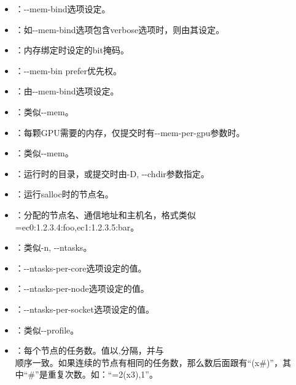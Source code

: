 \begin{itemize}
    \item {}：-{}-mem-bind选项设定。
    \item {}：如-{}-mem-bind选项包含verbose选项时，则由其设定。
    \item {}：内存绑定时设定的bit掩码。
	\item {}：-{}-mem-bin prefer优先权。
    \item {}：由-{}-mem-bind选项设定。
	\item {}：类似-{}-mem。
	\item {}：每颗GPU需要的内存，仅提交时有-{}-mem-per-gpu参数时。
	\item {}：类似-{}-mem。
	\item {}：运行时的目录，或提交时由-D, -{}-chdir参数指定。
	\item {}：运行salloc时的节点名。
	\item {}：分配的节点名、通信地址和主机名，格式类似\\=ec0:1.2.3.4:foo,ec1:1.2.3.5:bar。
	\item {}：类似-n, -{}-ntasks。
	\item {}：-{}-ntasks-per-core选项设定的值。
	\item {}：-{}-ntasks-per-node选项设定的值。
	\item {}：-{}-ntasks-per-socket选项设定的值。
	\item {}：类似-{}-profile。
	\item {}：每个节点的任务数。值以,分隔，并与\\顺序一致。如果连续的节点有相同的任务数，那么数后面跟有``(x\#)''，其中``\#''是重复次数。如：``=2(x3),1''。
\end{itemize}

